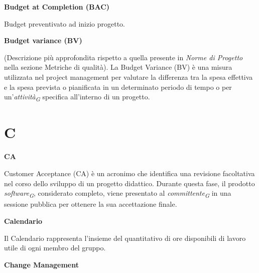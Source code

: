 \documentclass{article}
\begin{document}
\vspace{0.4cm}

\textbf{Budget at Completion (BAC)}

\vspace{0.1cm}

Budget preventivato ad inizio progetto.

\vspace{0.4cm}

\textbf{Budget variance (BV)}

\vspace{0.1cm}

(Descrizione più approfondita rispetto a quella presente in \textit{Norme di Progetto} nella sezione Metriche di qualità).
La Budget Variance (BV) è una misura utilizzata nel project management per valutare la differenza tra la spesa effettiva e la spesa prevista o pianificata in un determinato periodo di tempo o per un'\textit{attività}\textsubscript{\textit{G}} specifica all'interno di un progetto.

\pagebreak
\section*{C}
{}

\vspace{0.4cm}

\textbf{CA}

\vspace{0.1cm}

Customer Acceptance (CA) è un acronimo che identifica una revisione facoltativa nel corso dello sviluppo di un progetto didattico. Durante questa fase, il prodotto \textit{software}\textsubscript{\textit{G}}, considerato completo, viene presentato al \textit{committente}\textsubscript{\textit{G}} in una sessione pubblica per ottenere la sua accettazione finale.

\vspace{0.4cm}

\textbf{Calendario}

\vspace{0.1cm}

Il Calendario rappresenta l’insieme del quantitativo di ore disponibili di lavoro utile di ogni membro del gruppo.

\vspace{0.4cm}

\textbf{Change Management}

\vspace{0.1cm}
\end{document}
